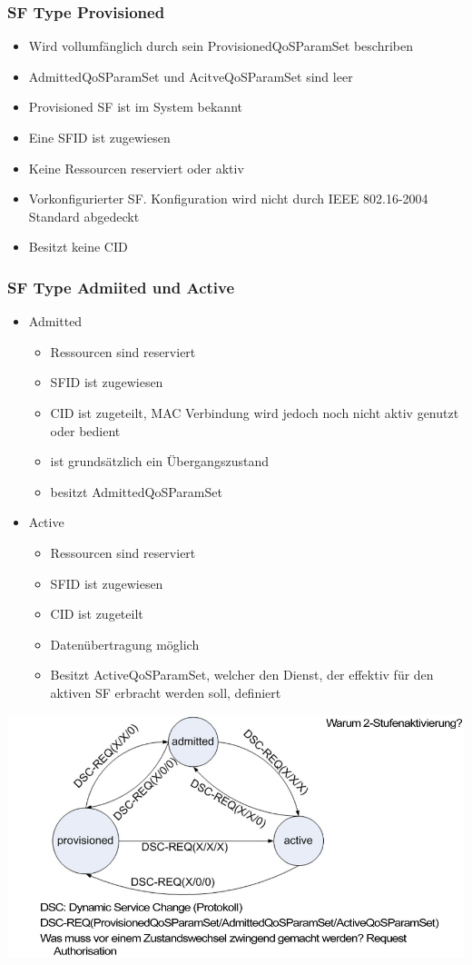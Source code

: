 \subsubsection{SF Type Provisioned}
\begin{itemize}
\item Wird vollumfänglich durch sein ProvisionedQoSParamSet beschriben
\item AdmittedQoSParamSet und AcitveQoSParamSet sind leer
\item Provisioned SF ist im System bekannt
\item Eine SFID ist zugewiesen
\item Keine Ressourcen reserviert oder aktiv
\item Vorkonfigurierter SF. Konfiguration wird nicht durch IEEE 802.16-2004 Standard abgedeckt
\item Besitzt keine CID
\end{itemize}

\subsubsection{SF Type Admiited und Active}
\begin{itemize}
\item Admitted
\begin{itemize}
\item Ressourcen sind reserviert
\item SFID ist zugewiesen
\item CID ist zugeteilt, MAC Verbindung wird jedoch noch nicht aktiv genutzt oder bedient
\item ist grundsätzlich ein Übergangszustand
\item besitzt AdmittedQoSParamSet
\end{itemize}
\item Active
\begin{itemize}
\item Ressourcen sind reserviert
\item SFID ist zugewiesen
\item CID ist zugeteilt
\item Datenübertragung möglich
\item Besitzt ActiveQoSParamSet, welcher den Dienst, der effektiv für den aktiven SF erbracht werden soll, definiert
\end{itemize}
\end{itemize}
\includegraphics[width = 0.75 \linewidth]{./pics/sfzustand.png} 

